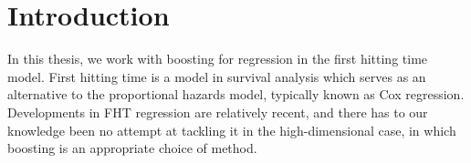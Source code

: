 \chapter{Introduction}
\label{sec:intro}

In this thesis, we work with boosting for regression in the first hitting time model. First hitting time is a model in survival analysis which serves as an alternative to the proportional hazards model, typically known as Cox regression. Developments in FHT regression are relatively recent, and there has to our knowledge been no attempt at tackling it in the high-dimensional case, in which boosting is an appropriate choice of method.